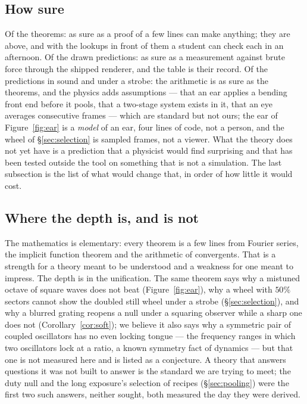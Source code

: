\subsection{How sure}
Of the theorems: as sure as a proof of a few lines can make anything; they
are above, and with the lookups in front of them a student can check each
in an afternoon. Of the drawn predictions: as sure as a measurement against
brute force through the shipped renderer, and the table is their record.
Of the predictions in sound and under a strobe: the arithmetic is as sure
as the theorems, and the physics adds assumptions --- that an ear applies
a bending front end before it pools, that a two-stage system exists in it,
that an eye averages consecutive frames --- which are standard but not
ours; the ear of Figure~\ref{fig:ear} is a \emph{model} of an ear, four
lines of code, not a person, and the wheel of \S\ref{sec:selection} is
sampled frames, not a viewer. What the theory does not yet have is a
prediction that a physicist would find surprising and that has been tested
outside the tool on something that is not a simulation. The last
subsection is the list of what would change that, in order of how little it
would cost.

\subsection{Where the depth is, and is not}
The mathematics is elementary: every theorem is a few lines from Fourier
series, the implicit function theorem and the arithmetic of convergents.
That is a strength for a theory meant to be understood and a weakness for
one meant to impress. The depth is in the unification. The same theorem
says why a mistuned octave of square waves does not beat
(Figure~\ref{fig:ear}), why a wheel with $50\%$ sectors cannot show the
doubled still wheel under a strobe (\S\ref{sec:selection}), and why a
blurred grating reopens a null under a squaring observer while a sharp one
does not (Corollary~\ref{cor:soft}); we believe it also says why a
symmetric pair of coupled oscillators has no even locking tongue --- the
frequency ranges in which two oscillators lock at a ratio, a known
symmetry fact of dynamics --- but that one is not measured here and is
listed as a conjecture. A theory that answers questions it was not built
to answer is the standard we are trying to meet; the duty null and the
long exposure's selection of recipes (\S\ref{sec:pooling}) were the first
two such answers, neither sought, both measured the day they were derived.

